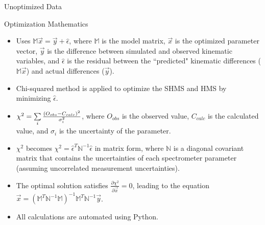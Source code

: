 \documentclass[final]{beamer}
\newlength{\colwidth}
\begin{document}
\begin{frame}[t]
\begin{columns}[t]
\begin{column}{\colwidth}
\begin{block}{Unoptimized Data}
\end{block}


\begin{exampleblock}{Optimization Mathematics}
\begin{itemize}
    \item Uses $\mathbb{M}\vec{x}=\vec{y}+\hat\epsilon$, where $\mathbb{M}$ is the model matrix, $\vec{x}$ is the optimized parameter vector, $\vec{y}$ is the difference between simulated and observed kinematic variables, and $\hat\epsilon$ is the residual between the ``predicted" kinematic differences ($\mathbb{M}\vec{x}$) and actual differences ($\vec{y}$).
    \item  Chi-squared method is applied to optimize the SHMS and HMS by minimizing $\hat\epsilon$.
    \item $\scriptsize \chi^2=\sum\limits_{i}\frac{(O_{obs}-C_{calc})^2}{\sigma^2_i}$, where $O_{obs}$ is the observed value, $C_{calc}$ is the calculated value, and $\sigma_{i}$ is the uncertainty of the parameter.
    \item $\chi^2$ becomes $\chi^2=\hat\epsilon^T\mathbb{N}^{-1}\hat\epsilon$ in matrix form, where $\mathbb{N}$ is a diagonal covariant matrix that contains the uncertainties of each spectrometer parameter (assuming uncorrelated measurement uncertainties).
    \item The optimal solution satisfies $\frac{\partial \chi^2}{\partial \vec{x}}=0$, leading to the equation $ \vec{x}=(\mathbb{M}^T\mathbb{N}^{-1}\mathbb{M})^{-1}\mathbb{M}^T\mathbb{N}^{-1}\vec{y}$.
    \item All calculations are automated using Python.
\end{itemize}


\end{exampleblock}
\end{column}
\end{columns}
\end{frame}
\end{document}
